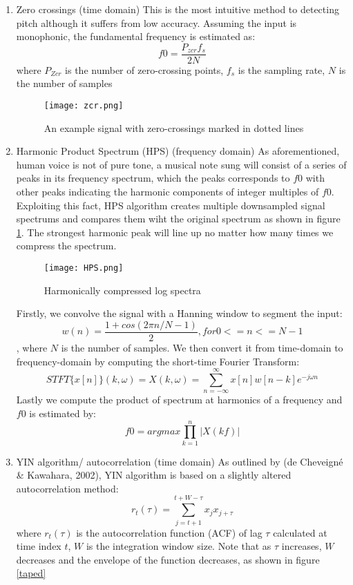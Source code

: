 \begin{enumerate}
	\item Zero crossings (time domain)
	This is the most intuitive method to detecting pitch although it suffers from low accuracy.
	Assuming the input is monophonic, the fundamental frequency is estimated as:
	\[f0 = \frac{P_{zcr}f_s}{2N}\]
	where $P_{Zcr}$ is the number of zero-crossing points, $f_s$ is the sampling rate,
	$N$ is the number of samples
	\begin{figure}
		\texttt{[image: zcr.png]}
		\caption{An example signal with zero-crossings marked in dotted lines \cite{zcr}}
	\end{figure}

	\item Harmonic Product Spectrum (HPS) (frequency domain)
	As aforementioned, human voice is not of pure tone, a musical note sung will consist of a series of peaks in its frequency spectrum,
	which the peaks corresponds to $f0$ with other peaks indicating the harmonic components of integer multiples of $f0$. 
	Exploiting this fact, HPS algorithm creates multiple downsampled signal spectrums and compares them wiht the original spectrum as shown in figure 
	\ref{HPS}. The strongest harmonic peak will line up no matter how many times we compress the spectrum.
	
	\begin{figure}
		\texttt{[image: HPS.png]}
		\caption{Harmonically compressed log spectra \cite{HPS}}
		\label{HPS}
	\end{figure}
	
	Firstly, we convolve the signal with a Hanning window to segment the input:
	\[w(n) = \frac{1+cos(2\pi n/N-1)}{2}, for 0<= n<= N-1\], where $N$ is the number of samples.
	We then convert it from time-domain to frequency-domain by computing the short-time Fourier Transform:
	\[STFT \{x[n]\}(k,\omega) = X(k,\omega )= \sum _{n=-\infty }^{\infty }x[n]w[n-k]e^{-j\omega n}\]
	Lastly we compute the product of spectrum at harmonics of a frequency and $f0$ is estimated by:
	\[f0 = argmax\prod_{k=1}^{n}|X(kf)|\] 

	\item YIN algorithm/ autocorrelation (time domain)
	As outlined by (de Cheveigné & Kawahara, 2002), YIN algorithm is based on a slightly altered autocorrelation method:
	\[r_t(\tau)=\sum_{j=t+1}^{t+W-\tau}x_j x_{j+\tau}\]
	where $r_t(\tau)$ is the autocorrelation function (ACF) of lag $\tau$ calculated at time index $t$, $W$ is the integration
	window size. Note that as $\tau$ increases, $W$ decreases and the envelope of the function decreases, as shown in figure 
	\ref{taped}


\end{enumerate}
